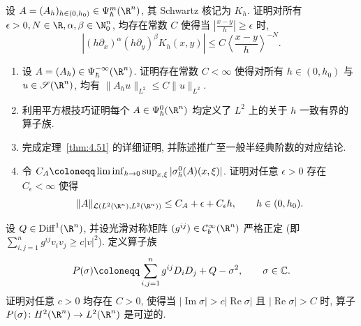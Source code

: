 \begin{exer}\label{ex:4.9}
设 $A = (A_h)_{h \in (0, h_0)} \in \Psi_\hbar^m(\R^n)$, 其 Schwartz 核记为 $K_h$. 证明对所有 $\epsilon > 0, N \in \R, \alpha, \beta \in \N_0^n$, 均存在常数 $C$ 使得当 $\left|\frac{x-y}{h}\right| \ge \epsilon$ 时,
\begin{equation}\label{eq:4.167}
    \left| (h \partial_x)^\alpha (h \partial_y)^\beta K_h(x, y) \right| \le C \left\langle \frac{x-y}{h} \right\rangle^{-N}.
\end{equation}
\end{exer}

\begin{exer}\label{ex:4.10}
\begin{enumerate}
    \item 设 $A = (A_h) \in \Psi_\hbar^{-\infty}(\R^n)$. 证明存在常数 $C < \infty$ 使得对所有 $h \in (0, h_0)$ 与 $u \in \Schwartz(\R^n)$, 均有 $\|A_h u\|_{L^2} \le C \|u\|_{L^2}$.
    \item 利用平方根技巧证明每个 $A \in \Psi_\hbar^0(\R^n)$ 均定义了 $L^2$ 上的关于 $h$ 一致有界的算子族.
    \item 完成定理~\ref{thm:4.51} 的详细证明, 并陈述推广至一般半经典阶数的对应结论.
    \item 令 $C_A \defeq \liminf_{h \to 0} \sup_{x, \xi} |\sigma_\hbar^0(A)(x, \xi)|$. 证明对任意 $\epsilon > 0$ 存在 $C_\epsilon < \infty$ 使得
    \begin{equation}\label{eq:4.168}
        \|A\|_{\mathcal{L}(L^2(\R^n), L^2(\R^n))} \le C_A + \epsilon + C_\epsilon h, \qquad h \in (0, h_0).
    \end{equation}
\end{enumerate}
\end{exer}

\begin{exer}[高频极限下谱族的求逆, I]\label{ex:4.11}
设 $Q \in \Diff^1(\R^n)$, 并设光滑对称矩阵 $(g^{ij}) \in \mathcal{C}_b^\infty(\R^n)$ 严格正定 (即 $\sum_{i, j=1}^n g^{ij} v_i v_j \ge c |v|^2$). 定义算子族
\begin{equation}\label{eq:4.169}
    P(\sigma) \defeq \sum_{i, j=1}^n g^{ij} D_i D_j + Q - \sigma^2, \qquad \sigma \in \mathbb{C}.
\end{equation}
证明对任意 $c > 0$ 均存在 $C > 0$, 使得当 $|\!\operatorname{Im} \sigma| > c |\!\operatorname{Re} \sigma|$ 且 $|\!\operatorname{Re} \sigma| > C$ 时, 算子 $P(\sigma) \colon H^2(\R^n) \to L^2(\R^n)$ 是可逆的.
\end{exer}

